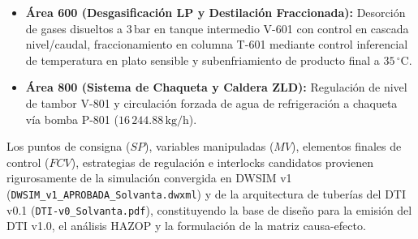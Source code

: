 \documentclass[10pt,letterpaper]{article}
\begin{document}
\begin{itemize}
    \item \textbf{Área 600 (Desgasificación LP y Destilación Fraccionada):} Desorción de gases disueltos a $3\,\text{bar}$ en tanque intermedio V-601 con control en cascada nivel/caudal, fraccionamiento en columna T-601 mediante control inferencial de temperatura en plato sensible y subenfriamiento de producto final a $35\,^\circ\text{C}$.
    \item \textbf{Área 800 (Sistema de Chaqueta y Caldera ZLD):} Regulación de nivel de tambor V-801 y circulación forzada de agua de refrigeración a chaqueta vía bomba P-801 ($16\,244.88\,\text{kg/h}$).
\end{itemize}

Los puntos de consigna ($SP$), variables manipuladas ($MV$), elementos finales de control ($FCV$), estrategias de regulación e interlocks candidatos provienen rigurosamente de la simulación convergida en DWSIM v1 (\texttt{DWSIM\_v1\_}\allowbreak\texttt{APROBADA\_}\allowbreak\texttt{Solvanta.dwxml}) y de la arquitectura de tuberías del DTI v0.1 (\texttt{DTI-v0\_Solvanta.pdf}), constituyendo la base de diseño para la emisión del DTI v1.0, el análisis HAZOP y la formulación de la matriz causa-efecto.
\end{document}
